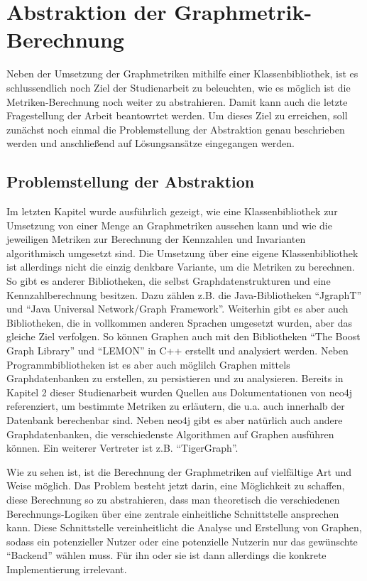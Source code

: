 \documentclass[a4paper,12pt,ngerman,chapterprefix=false,listof=totoc,bibliography=totoc]{scrreprt}
\begin{document}
{{\chapter{Abstraktion der Graphmetrik-Berechnung}
{
Neben der Umsetzung der Graphmetriken mithilfe einer Klassenbibliothek, ist es schlussendlich noch Ziel der Studienarbeit zu beleuchten, wie es möglich ist die Metriken-Berechnung noch weiter zu abstrahieren. Damit kann auch die letzte Fragestellung der Arbeit beantowrtet werden. Um dieses Ziel zu erreichen, soll zunächst noch einmal die Problemstellung der Abstraktion genau beschrieben werden und anschließend auf Lösungsansätze eingegangen werden.
}
\section{Problemstellung der Abstraktion}
{
Im letzten Kapitel wurde ausführlich gezeigt, wie eine Klassenbibliothek zur Umsetzung von einer Menge an Graphmetriken aussehen kann und wie die jeweiligen Metriken zur Berechnung der Kennzahlen und Invarianten algorithmisch umgesetzt sind. Die Umsetzung über eine eigene Klassenbibliothek ist allerdings nicht die einzig denkbare Variante, um die Metriken zu berechnen. So gibt es anderer Bibliotheken, die selbst Graphdatenstrukturen und eine Kennzahlberechnung besitzen. Dazu zählen z.B. die Java-Bibliotheken "`JgraphT"' und "`Java Universal Network/Graph Framework"'. Weiterhin gibt es aber auch Bibliotheken, die in vollkommen anderen Sprachen umgesetzt wurden, aber das gleiche Ziel verfolgen. So können Graphen auch mit den Bibliotheken "`The Boost Graph Library"' und "`LEMON"' in C++ erstellt und analysiert werden. Neben Programmbibliotheken ist es aber auch möglilch Graphen mittels Graphdatenbanken zu erstellen, zu persistieren und zu analysieren. Bereits in Kapitel 2 dieser Studienarbeit wurden Quellen aus Dokumentationen von neo4j referenziert, um bestimmte Metriken zu erläutern, die u.a. auch innerhalb der Datenbank berechenbar sind. Neben neo4j gibt es aber natürlich auch andere Graphdatenbanken, die verschiedenste Algorithmen auf Graphen ausführen können. Ein weiterer Vertreter ist z.B. "`TigerGraph"'.

Wie zu sehen ist, ist die Berechnung der Graphmetriken auf vielfältige Art und Weise möglich. Das Problem besteht jetzt darin, eine Möglichkeit zu schaffen, diese Berechnung so zu abstrahieren, dass man theoretisch die verschiedenen Berechnungs-Logiken über eine zentrale einheitliche Schnittstelle ansprechen kann. Diese Schnittstelle vereinheitlicht die Analyse und Erstellung von Graphen, sodass ein potenzieller Nutzer oder eine potenzielle Nutzerin nur das gewünschte "`Backend"' wählen muss. Für ihn oder sie ist dann allerdings die konkrete Implementierung irrelevant.
}
}}
\end{document}
